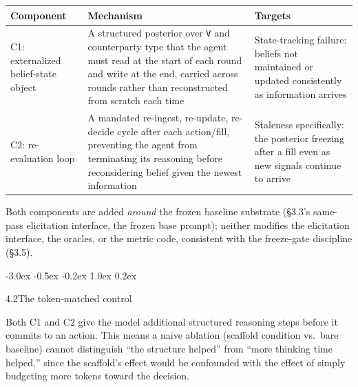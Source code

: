\documentclass[
  11pt,
]{article}
\makeatletter
\newcounter{none} %
\renewcommand{\subsection}{%
  \@startsection{subsection}{2}{\z@}%
                {-3.0ex \@plus -0.5ex \@minus -0.2ex}%
                { 1.0ex \@plus  0.2ex}%
                {\normalsize\bf\raggedright}%
}
\makeatother
\begin{document}
{\def\LTcaptype{none} %
\begin{longtable}[]{@{}
  >{\raggedright\arraybackslash}p{}
  >{\raggedright\arraybackslash}p{}
  >{\raggedright\arraybackslash}p{}@{}}
\toprule\noalign{}
\begin{minipage}[b]{\linewidth}\raggedright
Component
\end{minipage} & \begin{minipage}[b]{\linewidth}\raggedright
Mechanism
\end{minipage} & \begin{minipage}[b]{\linewidth}\raggedright
Targets
\end{minipage} \\
\midrule\noalign{}
\endhead
\bottomrule\noalign{}
\endlastfoot
C1: externalized belief-state object & A structured posterior over \texttt{V} and counterparty type that the agent must read at the start of each round and write at the end, carried across rounds rather than reconstructed from scratch each time & State-tracking failure: beliefs not maintained or updated consistently as information arrives \\
C2: re-evaluation loop & A mandated re-ingest, re-update, re-decide cycle after each action/fill, preventing the agent from terminating its reasoning before reconsidering belief given the newest information & Staleness specifically: the posterior freezing after a fill even as new signals continue to arrive \\
\end{longtable}
}

Both components are added \emph{around} the frozen baseline substrate (§3.3's same-pass elicitation interface, the frozen base prompt); neither modifies the elicitation interface, the oracles, or the metric code, consistent with the freeze-gate discipline (§3.5).

\subsection{4.2\quad The token-matched control}\label{the-token-matched-control}

Both C1 and C2 give the model additional structured reasoning steps before it commits to an action. This means a naive ablation (scaffold condition vs.~bare baseline) cannot distinguish ``the structure helped'' from ``more thinking time helped,'' since the scaffold's effect would be confounded with the effect of simply budgeting more tokens toward the decision.
\end{document}
